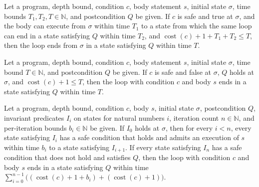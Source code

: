 \begin{theorem}
\label{Light.Ends.whileStep}
\leanok
{}
Let a program, depth bound, condition $c$, body statement $s$, initial state $\sigma$,
time bounds $T_1,T_2,T\in\mathbb N$, and postcondition $Q$ be given. If $c$ is safe and
true at $\sigma$, and the body can execute from $\sigma$ within time $T_1$ to a state
from which the same loop can end in a state satisfying $Q$ within time $T_2$, and
$\operatorname{cost}(c)+1+T_1+T_2\le T$, then the loop ends from $\sigma$ in a state
satisfying $Q$ within time $T$.
\end{theorem}

\begin{theorem}
\label{Light.Ends.whileDone}
\leanok
{}
Let a program, depth bound, condition $c$, body statement $s$, initial state $\sigma$,
time bound $T\in\mathbb N$, and postcondition $Q$ be given. If $c$ is safe and false at
$\sigma$, $Q$ holds at $\sigma$, and $\operatorname{cost}(c)+1\le T$, then the loop with
condition $c$ and body $s$ ends in a state satisfying $Q$ within time $T$.
\end{theorem}

\begin{theorem}
\label{Light.Ends.while}
\leanok
{}
Let a program, depth bound, condition $c$, body $s$, initial state $\sigma$,
postcondition $Q$, invariant predicates $I_i$ on states for natural numbers $i$,
iteration count $n\in\mathbb N$, and per-iteration bounds $b_i\in\mathbb N$ be given. If
$I_0$ holds at $\sigma$, then for every $i<n$, every state satisfying $I_i$ has a safe
condition that holds and admits an execution of $s$ within time $b_i$ to a state
satisfying $I_{i+1}$. If every state satisfying $I_n$ has a safe condition that does not
hold and satisfies $Q$, then the loop with condition $c$ and body $s$ ends in a state
satisfying $Q$ within time
$\sum_{i=0}^{n-1}\bigl((\operatorname{cost}(c)+1+b_i)+(\operatorname{cost}(c)+1)\bigr)$.
\end{theorem}

